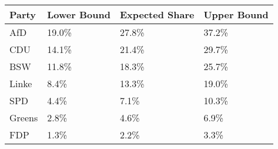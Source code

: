 \begin{tabular}{llll}
  \hline
Party & Lower Bound & Expected Share & Upper Bound \\ 
  \hline
AfD & 19.0\% & 27.8\% & 37.2\% \\ 
  CDU & 14.1\% & 21.4\% & 29.7\% \\ 
  BSW & 11.8\% & 18.3\% & 25.7\% \\ 
  Linke & 8.4\% & 13.3\% & 19.0\% \\ 
  SPD & 4.4\% & 7.1\% & 10.3\% \\ 
  Greens & 2.8\% & 4.6\% & 6.9\% \\ 
  FDP & 1.3\% & 2.2\% & 3.3\% \\ 
   \hline
\end{tabular}
